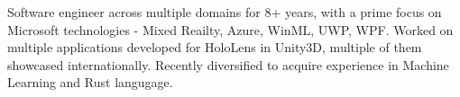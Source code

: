 \documentclass[11pt, a4paper]{awesome-cv}
\begin{document}
\makecvheader[C]


\begin{cvparagraph}

	Software engineer across multiple domains for 8+ years, with a prime focus on Microsoft technologies - Mixed Reailty, Azure, WinML, UWP, WPF. Worked on multiple applications developed for HoloLens in Unity3D, multiple of them showcased internationally. Recently diversified to acquire experience in Machine Learning and Rust langugage.
\end{cvparagraph}
\end{document}
